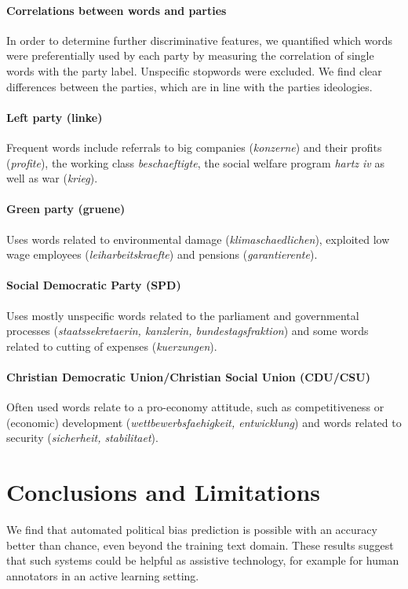 \documentclass[11pt]{article}
\begin{document}
%
\paragraph{Correlations between words and parties}
In order to determine further discriminative features, we quantified which words were preferentially used by each party by measuring the correlation of single words with the party label. Unspecific stopwords were excluded. We find clear differences between the parties, which are in line with the parties ideologies. 
\paragraph{\bf Left party (linke)} Frequent words include referrals to big companies ({\em konzerne}) and their profits ({\em profite}), the working class {\em beschaeftigte}, the social welfare program {\em hartz iv} as well as war ({\em krieg}).
\paragraph{\bf Green party (gruene)} Uses words related to environmental damage ({\em klimaschaedlichen}), exploited low wage employees ({\em leiharbeitskraefte}) and pensions ({\em garantierente}).
\paragraph{\bf Social Democratic Party (SPD)} Uses mostly unspecific words related to the parliament and governmental processes ({\em staatssekretaerin, kanzlerin, bundestagsfraktion}) and some words related to cutting of expenses ({\em kuerzungen}).
\paragraph{\bf Christian Democratic Union/Christian Social Union (CDU/CSU)}
Often used words relate to a pro-economy attitude, such as competitiveness or (economic) development ({\em wettbewerbsfaehigkeit, entwicklung}) and words related to security ({\em sicherheit, stabilitaet}). 

\section{Conclusions and Limitations}\label{sec:conclusion}
We find that automated political bias prediction is possible with an accuracy better than chance, even beyond the training text domain. These results suggest that such systems could be helpful as assistive technology, for example for human annotators in an active learning setting. 
\end{document}
